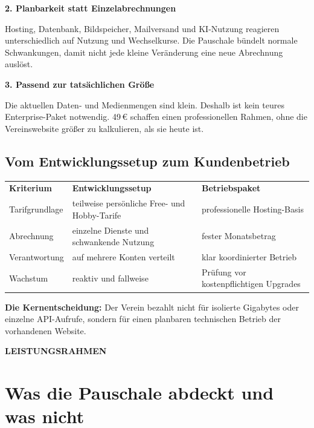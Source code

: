 \documentclass[11pt,a4paper]{article}
\newcommand{\eur}[1]{#1\,€}
\newcommand{\eyebrow}[1]{%
  {\sffamily\footnotesize\bfseries\color{NordBlue}\MakeUppercase{#1}}\\[2mm]
}
\begin{document}
\begin{reasonbox}
  {\sffamily\large\bfseries\color{NordNavy}2. Planbarkeit statt Einzelabrechnungen}

  Hosting, Datenbank, Bildspeicher, Mailversand und KI-Nutzung reagieren unterschiedlich auf Nutzung und Wechselkurse. Die Pauschale bündelt normale Schwankungen, damit nicht jede kleine Veränderung eine neue Abrechnung auslöst.
\end{reasonbox}

\begin{reasonbox}
  {\sffamily\large\bfseries\color{NordNavy}3. Passend zur tatsächlichen Größe}

  Die aktuellen Daten- und Medienmengen sind klein. Deshalb ist kein teures Enterprise-Paket notwendig. \eur{49} schaffen einen professionellen Rahmen, ohne die Vereinswebsite größer zu kalkulieren, als sie heute ist.
\end{reasonbox}

\subsection{Vom Entwicklungssetup zum Kundenbetrieb}

\begin{tabularx}{\textwidth}{L{46mm}Y Y}
  \toprule
  \color{white}\sffamily\bfseries Kriterium &
  \color{white}\sffamily\bfseries Entwicklungssetup &
  \color{white}\sffamily\bfseries Betriebspaket \\
  Tarifgrundlage & teilweise persönliche Free- und Hobby-Tarife & professionelle Hosting-Basis \\
  Abrechnung & einzelne Dienste und schwankende Nutzung & fester Monatsbetrag \\
  Verantwortung & auf mehrere Konten verteilt & klar koordinierter Betrieb \\
  Wachstum & reaktiv und fallweise & Prüfung vor kostenpflichtigen Upgrades \\
  \bottomrule
\end{tabularx}

\begin{bluebox}
  \textbf{Die Kernentscheidung:} Der Verein bezahlt nicht für isolierte Gigabytes oder einzelne API-Aufrufe, sondern für einen planbaren technischen Betrieb der vorhandenen Website.
\end{bluebox}

\newpage

\eyebrow{Leistungsrahmen}
\section{Was die Pauschale abdeckt und was nicht}
\end{document}

